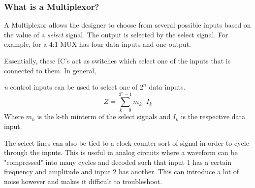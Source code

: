 \documentclass[12pt]{article}
\begin{document}
\subsubsection*{What is a Multiplexor?}
A Multiplexor allows the designer to choose from several possible inputs based
on the value of a \textit{select} signal.
The output is selected by the select signal. For example, for a 4:1 MUX has four
data inputs and one output.
\begin{figure}[H]
\end{figure}
Essentially, these IC's act as switches which select one of the inputs that is
connected to them. In general,

\textit{n} control inputs can be used to select one of \(2^n\) data inputs.
\[
	Z = \sum_{k=0}^{2^n-1} m_k \cdot I_k
\]
Where \(m_k\) is the k-th minterm of the select signals and \(I_k\) is the
respective data input.

The select lines can also be tied to a clock counter sort of signal in order to
cycle through the inputs. This is useful in analog circuits where a waveform can
be "compressed" into many cycles and decoded such that input 1 has a certain
frequency and amplitude and input 2 has another. This can introduce a lot of
noise however and makes it difficult to troubleshoot.
\end{document}
